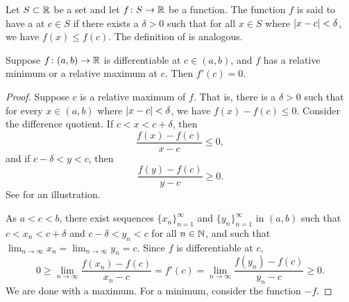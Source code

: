 \begin{defn}
Let $S \subset {\mathbb{R}}$ be a set and
let $f \colon S \to {\mathbb{R}}$ be a function.  The function $f$ is said to have
a \emph{}
at $c \in S$ if there exists a $\delta>0$
such that for all $x \in S$ where $\lvert {x-c} \rvert < \delta$,
we have $f(x) \leq f(c)$.
The definition of
\emph{}
is analogous.
\end{defn}

\begin{lemma}\label{relminmax:lemma}
Suppose $f \colon (a,b) \to {\mathbb{R}}$ is differentiable at $c \in (a,b)$,
and $f$ has
a relative minimum or a relative maximum at $c$.  Then
$f'(c) = 0$.
\end{lemma}

\begin{proof}
Suppose $c$ is a 
relative maximum of $f$.  That is, there is a $\delta > 0$ such
that for every $x \in (a,b)$ where
$\lvert {x-c} \rvert < \delta$, we have $f(x)-f(c) \leq 0$.
Consider the difference
quotient.  If $c < x < c+\delta$, then
\begin{equation*}
\frac{f(x)-f(c)}{x-c} \leq 0 ,
\end{equation*}
and if $c-\delta < y < c$, then
\begin{equation*}
\frac{f(y)-f(c)}{y-c} \geq 0 .
\end{equation*}
See  for an illustration.
\begin{myfigureht}
\caption{Slopes of secants at a relative maximum.\label{fig:critpt}}
\end{myfigureht}

As $a < c < b$, there exist
sequences $\{ x_n \}_{n=1}^\infty$ and
$\{ y_n \}_{n=1}^\infty$ in $(a,b)$
such that $c < x_n < c+\delta$ and
$c-\delta < y_n < c$ for all $n \in {\mathbb{N}}$, and such that
$\lim_{n\to\infty} x_n = \lim_{n\to\infty} y_n = c$.
Since $f$
is differentiable at $c$,
\begin{equation*}
0 \geq \lim_{n\to\infty} \frac{f(x_n)-f(c)}{x_n-c} 
=
f'(c)
=
\lim_{n\to\infty} \frac{f(y_n)-f(c)}{y_n-c} \geq 0.
\end{equation*}
We are done with a maximum.
For a minimum, consider
the function $-f$.
\end{proof}

